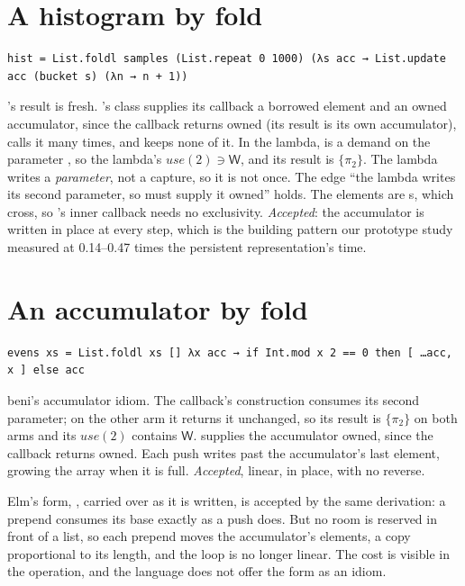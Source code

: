 \section{A histogram by fold}

\begin{Verbatim}
hist = List.foldl samples (List.repeat 0 1000) (λs acc → List.update acc (bucket s) (λn → n + 1))
\end{Verbatim}
's result is fresh. 's class supplies its callback a borrowed element and an
owned accumulator, since the callback returns owned (its result is its own accumulator), calls it many times, and
keeps none of it. In the lambda,  is a demand on the parameter , so the
lambda's $\mathit{use}(2) \ni \mathsf{W}$, and its result is $\{\pi_2\}$. The lambda writes a
\emph{parameter}, not a capture, so it is not once. The edge ``the lambda writes its second parameter, so
 must supply it owned'' holds. The elements are s, which cross, so 's
inner callback needs no exclusivity. \emph{Accepted}: the accumulator is written in place at every step,
which is the building pattern our prototype study measured at 0.14--0.47 times the persistent
representation's time.

\section{An accumulator by fold}

\begin{Verbatim}
evens xs = List.foldl xs [] λx acc → if Int.mod x 2 == 0 then [ …acc, x ] else acc
\end{Verbatim}
beni's accumulator idiom. The callback's construction consumes its second parameter; on the other arm it
returns it unchanged, so its result is $\{\pi_2\}$ on both arms and its $\mathit{use}(2)$ contains
$\mathsf{W}$.  supplies the accumulator owned, since the callback returns owned. Each push
writes past the accumulator's last element, growing the array when it is full. \emph{Accepted}, linear, in
place, with no reverse.

Elm's form, , carried over
as it is written, is accepted by the same derivation: a prepend consumes its base exactly as a push does.
But no room is reserved in front of a list, so each prepend moves the accumulator's elements, a copy
proportional to its length, and the loop is no longer linear. The cost is visible in the operation, and the
language does not offer the form as an idiom.

